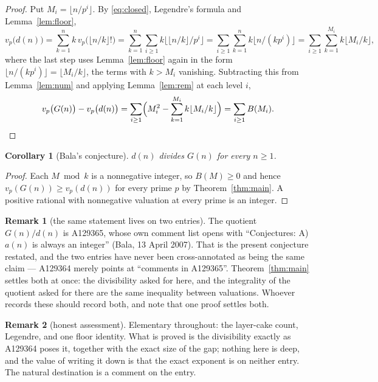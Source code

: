 \documentclass[11pt,a4paper]{article}
\theoremstyle{plain}
\newtheorem{corollary}[theorem]{Corollary}
\theoremstyle{definition}
\newtheorem*{remark}{Remark}
\begin{document}
\begin{proof}
Put $M_{i}=\lfloor n/p^{i}\rfloor$. By \eqref{eq:closed}, Legendre's formula and
Lemma~\ref{lem:floor},
\[
  v_{p}\bigl(d(n)\bigr)=\sum_{k=1}^{n}k\,v_{p}\bigl(\lfloor n/k\rfloor!\bigr)
  =\sum_{k=1}^{n}\sum_{i\ge1}k\bigl\lfloor\lfloor n/k\rfloor\big/p^{i}\bigr\rfloor
  =\sum_{i\ge1}\sum_{k=1}^{n}k\bigl\lfloor n/(kp^{i})\bigr\rfloor
  =\sum_{i\ge1}\sum_{k=1}^{M_{i}}k\lfloor M_{i}/k\rfloor,
\]
where the last step uses Lemma~\ref{lem:floor} again in the form
$\lfloor n/(kp^{i})\rfloor=\lfloor M_{i}/k\rfloor$, the terms with $k>M_{i}$ vanishing.
Subtracting this from Lemma~\ref{lem:num} and applying Lemma~\ref{lem:rem} at each level
$i$,
\[
  v_{p}\bigl(G(n)\bigr)-v_{p}\bigl(d(n)\bigr)
  =\sum_{i\ge1}\Bigl(M_{i}^{2}-\sum_{k=1}^{M_{i}}k\lfloor M_{i}/k\rfloor\Bigr)
  =\sum_{i\ge1}B(M_{i}).\qedhere
\]
\end{proof}

\begin{corollary}[Bala's conjecture]\label{cor:main}
$d(n)$ divides $G(n)$ for every $n\ge1$.
\end{corollary}

\begin{proof}
Each $M\bmod k$ is a nonnegative integer, so $B(M)\ge0$ and hence
$v_{p}(G(n))\ge v_{p}(d(n))$ for every prime $p$ by Theorem~\ref{thm:main}. A positive
rational with nonnegative valuation at every prime is an integer.
\end{proof}

\begin{remark}[the same statement lives on two entries]
The quotient $G(n)/d(n)$ is A129365, whose own comment list opens with ``Conjectures: A)
$a(n)$ is always an integer'' (Bala, 13 April 2007). That is the present conjecture
restated, and the two entries have never been cross-annotated as being the same claim ---
A129364 merely points at ``comments in A129365''. Theorem~\ref{thm:main} settles both at
once: the divisibility asked for here, and the integrality of the quotient asked for there
are the same inequality between valuations. Whoever records these should record both, and
note that one proof settles both.
\end{remark}

\begin{remark}[honest assessment]
Elementary throughout: the layer-cake count, Legendre, and one floor identity. What is
proved is the divisibility exactly as A129364 poses it, together with the exact size of the
gap; nothing here is deep, and the value of writing it down is that the exact exponent is
on neither entry. The natural destination is a comment on the entry.
\end{remark}
\end{document}
